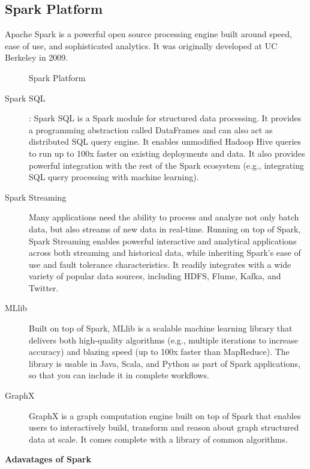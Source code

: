 \documentclass[twoside]{article}
\begin{document}
\subsection{Spark Platform}
Apache Spark is a powerful open source processing engine built around speed, ease of use, and sophisticated analytics. It was originally developed at UC Berkeley in 2009.
\begin{figure}[H]
\centering
\caption{Spark Platform \label{overflow}}
\end{figure}
\begin{description}
\item[Spark SQL]: Spark SQL is a Spark module for structured data processing. It provides a programming abstraction called DataFrames and can also act as distributed SQL query engine. It enables unmodified Hadoop Hive queries to run up to 100x faster on existing deployments and data. It also provides powerful integration with the rest of the Spark ecosystem (e.g., integrating SQL query processing with machine learning).
\item[Spark Streaming]Many applications need the ability to process and analyze not only batch data, but also streams of new data in real-time. Running on top of Spark, Spark Streaming enables powerful interactive and analytical applications across both streaming and historical data, while inheriting Spark’s ease of use and fault tolerance characteristics. It readily integrates with a wide variety of popular data sources, including HDFS, Flume, Kafka, and Twitter.
\item[MLlib]Built on top of Spark, MLlib is a scalable machine learning library that delivers both high-quality algorithms (e.g., multiple iterations to increase accuracy) and blazing speed (up to 100x faster than MapReduce). The library is usable in Java, Scala, and Python as part of Spark applications, so that you can include it in complete workflows.
\item[GraphX]GraphX is a graph computation engine built on top of Spark that enables users to interactively build, transform and reason about graph structured data at scale. It comes complete with a library of common algorithms.
\end{description}
\textbf{Adavatages of Spark}
\end{document}
